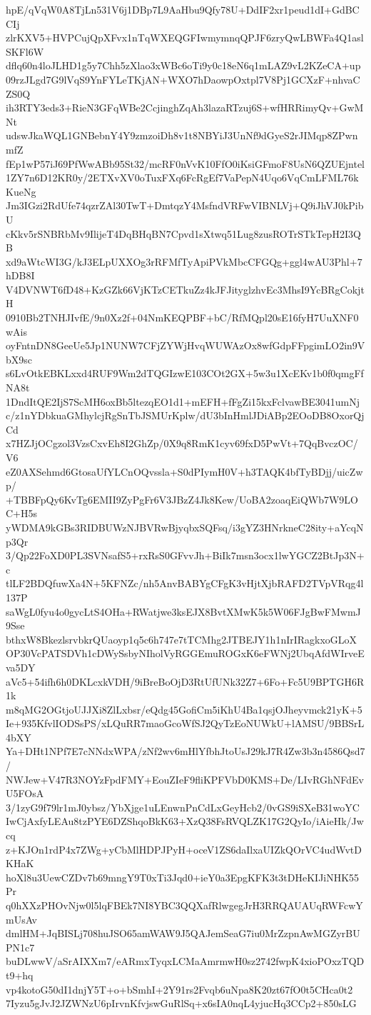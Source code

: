 hpE/qVqW0A8TjLn531V6j1DBp7L9AaHbu9Qfy78U+DdIF2xr1peud1dI+GdBCCIj
zlrKXV5+HVPCujQpXFvx1nTqWXEQGFIwmymnqQPJF6zryQwLBWFa4Q1aslSKFl6W
dflq60n4loJLHD1g5y7Chh5zXlao3xWBc6oTi9y0c18eN6q1mLAZ9vL2KZeCA+up
09rzJLgd7G9lVqS9YnFYLeTKjAN+WXO7hDaowpOxtpl7V8Pj1GCXzF+nhvaCZS0Q
ih3RTY3eds3+RieN3GFqWBe2CcjinghZqAh3lazaRTzuj6S+wfHRRimyQv+GwMNt
udswJkaWQL1GNBebnY4Y9zmzoiDh8v1t8NBYiJ3UnNf9dGyeS2rJIMqp8ZPwnmfZ
fEp1wP57iJ69PfWwABb95St32/mcRF0nVvK10FfO0iKsiGFmoF8UsN6QZUEjntel
1ZY7n6D12KR0y/2ETXvXV0oTuxFXq6FcRgEf7VaPepN4Uqo6VqCmLFML76kKueNg
Jm3IGzi2RdUfe74qzrZAl30TwT+DmtqzY4MsfndVRFwVIBNLVj+Q9iJhVJ0kPibU
cKkv5rSNBRbMv9IlijeT4DqBHqBN7Cpvd1sXtwq51Lug8zusROTrSTkTepH2I3QB
xd9aWtcWI3G/kJ3ELpUXXOg3rRFMfTyApiPVkMbcCFGQg+ggl4wAU3Phl+7hDB8I
V4DVNWT6fD48+KzGZk66VjKTzCETkuZz4kJFJityglzhvEc3MhsI9YcBRgCokjtH
0910Bb2TNHJIvfE/9n0Xz2f+04NmKEQPBF+bC/RfMQpl20sE16fyH7UuXNF0wAis
oyFntnDN8GeeUe5Jp1NUNW7CFjZYWjHvqWUWAzOx8wfGdpFFpgimLO2in9VbX9sc
s6LvOtkEBKLxxd4RUF9Wm2dTQGIzwE103COt2GX+5w3u1XcEKv1b0f0qmgFfNA8t
1DndItQE2IjS7ScMH6oxBb5ltezqEO1d1+mEFH+fFgZi15kxFclvawBE3041umNj
c/z1nYDbkuaGMhylcjRgSnTbJSMUrKplw/dU3bInHmlJDiABp2EOoDB8OxorQjCd
x7HZJjOCgzol3VzsCxvEh8I2GhZp/0X9q8RmK1cyv69fxD5PwVt+7QqBvczOC/V6
eZ0AXSehmd6GtosaUfYLCnOQvssla+S0dPIymH0V+h3TAQK4bfTyBDjj/uicZwp/
+TBBFpQy6KvTg6EMII9ZyPgFr6V3JBzZ4Jk8Kew/UoBA2zoaqEiQWb7W9LOC+H5s
yWDMA9kGBs3RIDBUWzNJBVRwBjyqbxSQFsq/i3gYZ3HNrkneC28ity+aYcqNp3Qr
3/Qp22FoXD0PL3SVNsafS5+rxRsS0GFvvJh+BiIk7msn3ocx1lwYGCZ2BtJp3N+c
tlLF2BDQfuwXa4N+5KFNZc/nh5AnvBABYgCFgK3vHjtXjbRAFD2TVpVRqg4l137P
saWgL0fyu4o0gycLtS4OHa+RWatjwe3ksEJX8BvtXMwK5k5W06FJgBwFMwmJ9Sse
bthxW8BkezlsrvbkrQUaoyp1q5c6h747e7tTCMhg2JTBEJY1h1nIrIRagkxoGLoX
OP30VcPATSDVh1cDWySsbyNIholVyRGGEmuROGxK6eFWNj2UbqAfdWIrveEva5DY
aVc5+54ifh6h0DKLcxkVDH/9iBreBoOjD3RtUfUNk32Z7+6Fo+Fc5U9BPTGH6R1k
m8qMG2OGtjoUJJXi8ZlLxbsr/eQdg45GofiCm5iKhU4Ba1qsjOJheyvmck21yK+5
Ie+935KfvlIODSsPS/xLQuRR7maoGcoWfSJ2QyTzEoNUWkU+lAMSU/9BBSrL4bXY
Ya+DHt1NPf7E7cNNdxWPA/zNf2wv6mHlYfbhJtoUsJ29kJ7R4Zw3b3n4586Qsd7/
NWJew+V47R3NOYzFpdFMY+EouZIeF9fliKPFVbD0KMS+De/LIvRGhNFdEvU5FOsA
3/1zyG9f79lr1mJ0ybsz/YbXjge1uLEnwnPnCdLxGeyHcb2/0vGS9iSXeB31woYC
IwCjAxfyLEAu8tzPYE6DZShqoBkK63+XzQ38FsRVQLZK17G2QyIo/iAieHk/Jwcq
z+KJOn1rdP4x7ZWg+yCbMlHDPJPyH+oceV1ZS6daIlxaUIZkQOrVC4udWvtDKHaK
hoXl8u3UewCZDv7b69mngY9T0xTi3Jqd0+ieY0a3EpgKFK3t3tDHeKIJiNHK55Pr
q0hXXzPHOvNjw0l5lqFBEk7NI8YBC3QQXafRlwgegJrH3RRQAUAUqRWFcwYmUsAv
dmlHM+JqBISLj708huJSO65amWAW9J5QAJemSeaG7iu0MrZzpnAwMGZyrBUPN1c7
buDLwwV/aSrAIXXm7/eARmxTyqxLCMaAmrmwH0sz2742fwpK4xioPOxzTQDt9+hq
vp4kotoG50dI1dnjY5T+o+bSmhI+2Y91rs2Fvqb6uNpa8K20zt67fO0t5CHca0t2
7Iyzu5gJvJ2JZWNzU6pIrvnKfvjswGuRlSq+x6sIA0nqL4yjucHq3CCp2+850sLG

